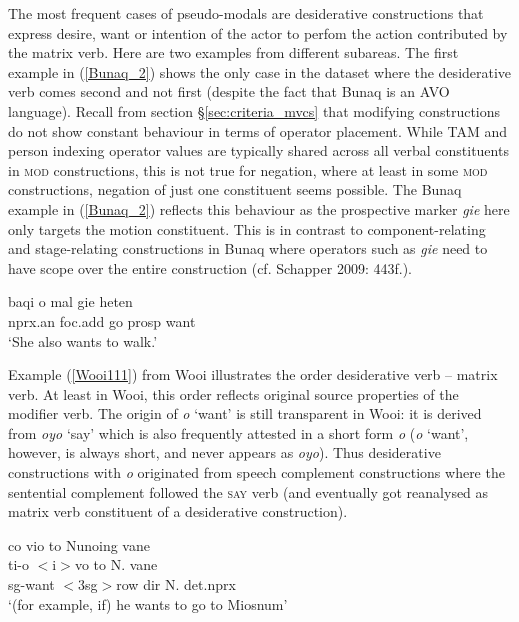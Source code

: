 The most frequent cases of pseudo-modals are desiderative constructions that express desire, want or intention of the actor to perfom the action contributed by the matrix verb. Here are two examples from different subareas. The first example in (\ref{Bunaq_2}) shows the only case in the dataset where the desiderative verb comes second and not first (despite the fact that Bunaq is an AVO language). Recall from section §\ref{sec:criteria_mvcs} that modifying constructions do not show constant behaviour in terms of operator placement. While TAM and person indexing operator values are typically shared across all verbal constituents in \textsc{mod} constructions, this is not true for negation, where at least in some \textsc{mod} constructions, negation of just one constituent seems possible. The Bunaq example in (\ref{Bunaq_2}) reflects this behaviour as the prospective marker \textit{gie} here only targets the motion constituent. This is in contrast to component-relating and stage-relating constructions in Bunaq where operators such as \textit{gie} need to have scope over the entire construction (cf. Schapper 2009: 443f.).

\ea \label{Bunaq_2}
\gll baqi o mal gie heten \\
\acs{nprx}.\acs{an} \acs{foc}.\acs{add} go \acs{prosp} want \\
\glft `She also wants to walk.’ \\ 
\z
\xe

Example (\ref{Wooi111}) from Wooi illustrates the order desiderative verb -- matrix verb. At least in Wooi, this order reflects  original source properties of the modifier verb. The origin of \textit{o} `want' is still transparent in Wooi: it is derived from \textit{oyo} `say' which is also frequently attested in a short form \textit{o} (\textit{o} `want', however, is always short, and never appears as \textit{oyo}). Thus desiderative constructions with \textit{o} originated from speech complement constructions where the sentential complement followed the \textsc{say} verb (and eventually got reanalysed as matrix verb constituent of a desiderative construction).

\ea \label{Wooi111}
\gll co vio to Nunoing vane \\
ti-o $<$i$>$vo to N. vane \\
\acs{sg}-want $<$3\acs{sg}$>$row \acs{dir} N. \acs{det}.\acs{nprx} \\
\glft `(for example, if) he wants to go to Miosnum' \\ 
\z
\xe

